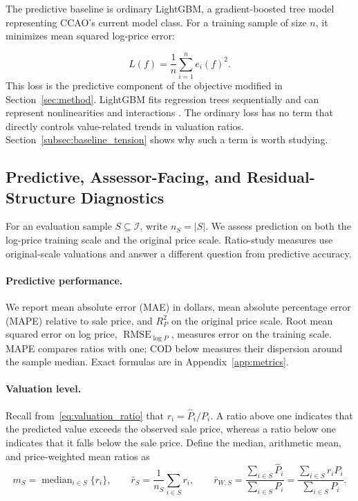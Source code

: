 \documentclass[10pt]{article}
\theoremstyle{definition}
\newcommand{\1}{\mathbf{1}}
\begin{document}
The predictive baseline is ordinary LightGBM, a gradient-boosted tree model representing CCAO's current model class. For a training sample of size $n$, it minimizes mean squared log-price error:

\begin{equation}
\label{eq:baseline_learning}
L(f)
=
\frac{1}{n}\sum_{i=1}^n e_i(f)^2.
\end{equation}
This loss is the predictive component of the objective modified in Section~\ref{sec:method}. LightGBM fits regression trees sequentially and can represent nonlinearities and interactions \cite{CCAOModelResAVM2026,lightgbm}. The ordinary loss has no term that directly controls value-related trends in valuation ratios. Section~\ref{subsec:baseline_tension} shows why such a term is worth studying.


\subsection{
\texorpdfstring{
Predictive, Assessor-Facing, and Residual-Structure Diagnostics}{Predictive, Assessor-Facing, and Residual-Structure Diagnostics}}
\label{subsec:metrics}


For an evaluation sample $S\subseteq\mathcal{I}$, write $n_S=|S|$. We assess prediction on both the log-price training scale and the original price scale. Ratio-study measures use original-scale valuations and answer a different question from predictive accuracy.

\paragraph{Predictive performance.}
We report mean absolute error (MAE) in dollars, mean absolute percentage error (MAPE) relative to sale price, and $R^2_P$ on the original price scale. Root mean squared error on log price, $\operatorname{RMSE}_{\log P}$, measures error on the training scale. MAPE compares ratios with one; COD below measures their dispersion around the sample median. Exact formulas are in Appendix~\ref{app:metrics}.


\paragraph{Valuation level.}
Recall from~\eqref{eq:valuation_ratio} that $r_i=\widehat P_i/P_i$. A ratio above one indicates that the predicted value exceeds the observed sale price, whereas a ratio below one indicates that it falls below the sale price. Define the median, arithmetic mean, and price-weighted mean ratios as
\begin{equation}
\label{eq:level_ratios}
m_S
=
\operatorname{median}_{i\in S}\{r_i\},
\qquad
\bar r_S
=
\frac{1}{n_S}\sum_{i\in S}r_i,
\qquad
\bar r_{W,S}
=
\frac{\sum_{i\in S}\widehat P_i}{\sum_{i\in S}P_i}
=
\frac{\sum_{i\in S}r_iP_i}{\sum_{i\in S}P_i}.
\end{equation}
\end{document}
